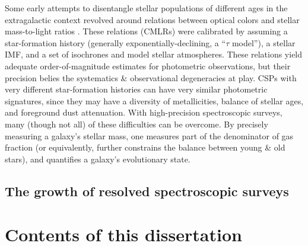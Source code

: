 Some early attempts to disentangle stellar populations of different ages in the extragalactic context revolved around relations between optical colors and stellar mass-to-light ratios \citep[see][]{bell_dejong_01, bell_03}. These relations (CMLRs) were calibrated by assuming a star-formation history (generally exponentially-declining, a ``$\tau$ model''), a stellar IMF, and a set of isochrones and model stellar atmospheres. These relations yield adequate order-of-magnitude estimates for photometric observations, but their precision belies the systematics \& observational degeneracies at play. CSPs with very different star-formation histories can have very similar photometric signatures, since they may have a diversity of metallicities, balance of stellar ages, and foreground dust attenuation. With high-precision spectroscopic surveys, many (though not all) of these difficulties can be overcome. By precisely measuring a galaxy's stellar mass, one measures part of the denominator of gas fraction (or equivalently, further constrains the balance between young \& old stars), and quantifies a galaxy's evolutionary state.

\subsection{The growth of resolved spectroscopic surveys}



\section{Contents of this dissertation}

